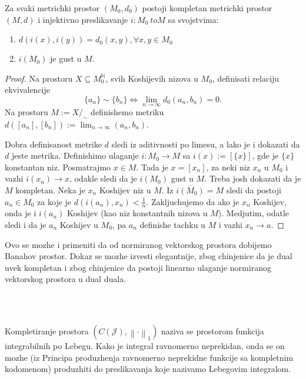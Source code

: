 \documentclass[a4paper,12pt]{article}
\newcommand{\NN}{\mathbb{N}}
\newcommand{\psj}{\subseteq}
\newcommand{\ds}{\displaystyle}
\newcommand{\norm}[1]{\left\lVert#1\right\rVert}
\begin{document}
\begin{tma}
	Za svaki metrichki prostor $(M_0, d_0)$ postoji kompletan metrichki prostor
	$(M,d)$ i in\-jektivno preslikavanje $i:M_0 \ to M$ sa svojstvima:
	\begin{enumerate}
		\item $d(i(x), i(y)) = d_0(x, y), \forall x, y \in M_0$
		\item $i(M_0)$ je gust u $M$.
	\end{enumerate}
\end{tma}
\begin{proof}
	Na prostoru $X\psj M_0^\NN$, svih Koshijevih nizova u $M_0$, definisati relaciju ekviva\-lencije
	\[ \{a_n\} \sim \{b_n\} \iff \lim_{n\to \infty} d_0(a_n, b_n) = 0 .\] 
	Na prostoru $M:= X/_\sim$ definishemo metriku $\ds{d([a_n], [b_n]):= \lim_{n\to \infty} (a_n, b_n)}$.

	Dobra definisanost metrike $d$ sledi iz aditivnosti po limesu, a lako je i dokazati da $d$ jeste metrika.
	Definishimo ulaganje $i:M_0 \to M$ sa $i(x) := [\{x\}]$, gde je $\{x\}$ konstantan niz. Posmatrajmo $x \in M$.
	Tada je $x = [x_n]$, za neki niz $x_n$ u $M_0$ i vazhi $i(x_n) \to x$, odakle sledi da je $i(M_0)$ gust u $M$.
	Treba josh dokazati da je $M$ kompletan. Neka je $x_n$ Koshijev niz u $M$. Iz $\overline{i(M_0)} = M$ sledi 
	da postoji $a_n \in M_0$ za koje je $d(i(a_n), x_n) < \frac{1}{n}$. Zakljuchujemo da ako je $x_n$ Koshijev,
	onda je i $i(a_n)$ Koshijev (kao niz konstantnih nizova u $M$). Medjutim, odatle sledi i da je $a_n$ Koshijev
	u $M_0$, pa $a_n$ definishe tachku u $M$ i vazhi $x_n \to a$.
\end{proof}

\begin{nap}
	Ovo se mozhe i primeniti da od normiranog vektorskog prostora dobijemo Banahov prostor. Dokaz 
	se mozhe izvesti elegantnije, zbog chinjenice da je dual uvek kompletan i zbog chinjenice 
	da postoji linearno ulaganje normiranog vektorskog prostora u dual duala.
\end{nap}
\\ \\
\begin{posl}
	Kompletiranje prostora $(C(\mathcal J), \norm{\cdot}_1)$ naziva se prostorom funkcija inte\-grabilnih po Lebegu. 
	Kako je integral ravnomerno neprekidan, onda se on mozhe (iz Principa produzhenja ravnomerno neprekidne funkcije
	sa kompletnim kodomenom) pro\-duzhiti do preslikavanja koje nazivamo Lebegovim integralom.
\end{posl}
\end{document}
